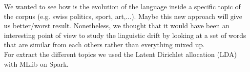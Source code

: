 We wanted to see how is the evolution of the language inside a specific topic of the corpus (e.g. swiss politics, sport, art,...). Maybe this new approach will give us better/worst result. Nonetheless, we thought that it would have been an interesting point of view to study the linguistic drift by looking at a set of words that are similar from each others rather than everything mixed up.\\
For extract the different topics we used the Latent Dirichlet allocation (LDA) with MLlib on Spark. 